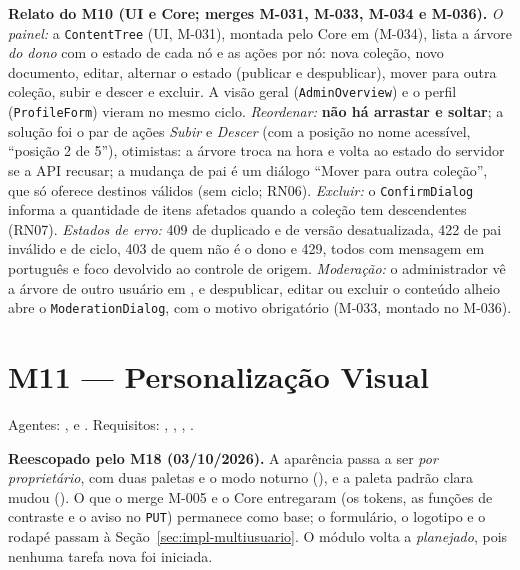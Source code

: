 \textbf{Relato do M10 (UI e Core; merges M-031, M-033, M-034 e M-036).} \emph{O painel:} a \texttt{ContentTree} (UI, M-031), montada pelo Core em  (M-034), lista a árvore \emph{do dono} com o estado de cada nó e as ações por nó: nova coleção, novo documento, editar, alternar o estado (publicar e despublicar), mover para outra coleção, subir e descer e excluir. A visão geral (\texttt{AdminOverview}) e o perfil (\texttt{ProfileForm}) vieram no mesmo ciclo. \emph{Reordenar:} \textbf{não há arrastar e soltar}; a solução foi o par de ações \emph{Subir} e \emph{Descer} (com a posição no nome acessível, ``posição 2 de 5''), otimistas: a árvore troca na hora e volta ao estado do servidor se a API recusar; a mudança de pai é um diálogo ``Mover para outra coleção'', que só oferece destinos válidos (sem ciclo; RN06). \emph{Excluir:} o \texttt{ConfirmDialog} informa a quantidade de itens afetados quando a coleção tem descendentes (RN07). \emph{Estados de erro:} 409 de  duplicado e de versão desatualizada, 422 de pai inválido e de ciclo, 403 de quem não é o dono e 429, todos com mensagem em português e foco devolvido ao controle de origem. \emph{Moderação:} o administrador vê a árvore de outro usuário em , e despublicar, editar ou excluir o conteúdo alheio abre o \texttt{ModerationDialog}, com o motivo obrigatório (M-033, montado no M-036).

\section{M11 --- Personalização Visual}\label{sec:impl-personalizacao}

\noindent{}\quad Agentes: ,  e . Requisitos: , , , .

\textbf{Reescopado pelo M18 (03/10/2026).} A aparência passa a ser \emph{por proprietário}, com duas paletas e o modo noturno (), e a paleta padrão clara mudou (). O que o merge M-005 e o Core entregaram (os tokens, as funções de contraste e o aviso no \texttt{PUT}) permanece como base; o formulário, o logotipo e o rodapé passam à Seção~\ref{sec:impl-multiusuario}. O módulo volta a \emph{planejado}, pois nenhuma tarefa nova foi iniciada.

